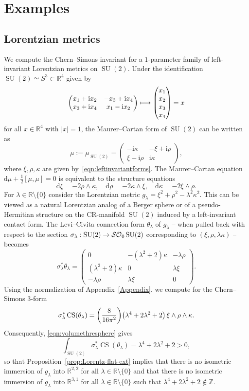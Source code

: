 \documentclass[AHL,Unicode,longabstracts]{cedram}
\DeclareMathOperator{\CS}{CS}
\DeclareMathOperator{\SU}{SU}
\renewcommand*{\d}{\mathrm{d}}
\renewcommand{\i}{\mathrm{i}}
\newcommand*{\R}{\mathbb{R}}
\newcommand{\Z}{\mathbb{Z}}
\newcommand{\clSO}{\mathcal{SO}}
\renewcommand*{\to}{\mathchoice{\longrightarrow}{\rightarrow}{\rightarrow}{\rightarrow}}
\let\oldmapsto\mapsto
\renewcommand*{\mapsto}{\mathchoice{\longmapsto}{\oldmapsto}{\oldmapsto}{\oldmapsto}}
\let\originalleft\left
\let\originalright\right
\renewcommand{\left}{\mathopen{}\mathclose\bgroup\originalleft}
\renewcommand{\right}{\aftergroup\egroup\originalright}
\newcommand*{\R}{\mathbb{R}}
\begin{document}
\section{Examples}\label{app:examples}

\subsection{Lorentzian metrics}

We compute the Chern--Simons invariant for a $1$-parameter family of left-invariant Lorentzian metrics on $\SU(2)$. Under the identification $\SU(2)\simeq S^3\subset \R^4$ given by
\[
\begin{pmatrix}
x_1+\i x_2 & -x_3+\i x_4 \\
x_3+\i x_4 & x_1-\i x_2
\end{pmatrix}
\mapsto
\begin{pmatrix} 
x_1 \\
x_2 \\
x_3 \\
x_4
\end{pmatrix}=x
\]
for all $x \in \R^4$ with $|x|=1$, the Maurer--Cartan form of $\SU(2)$ can be written as
\[
\mu:=\mu_{\SU(2)}=
\begin{pmatrix}
-\i \kappa & -\xi+\i \rho \\
\xi+\i\rho & \i \kappa
\end{pmatrix},
\]
where $\xi,\rho,\kappa$ are given by~\eqref{eqn:leftinvariantforms}. The Maurer--Cartan equation $\d\mu+\frac{1}{2}[\mu,\mu]=0$ is equivalent to the structure equations
\[
\d\xi=-2\rho\wedge\kappa, \quad \d\rho=-2\kappa\wedge\xi, \quad \d\kappa=-2\xi\wedge\rho.
\]
For $\lambda \in \R\setminus\{0\}$ consider the Lorentzian metric $g_{\lambda}=\xi^2+\rho^2-\lambda^2\kappa^2$. This can be viewed as a natural Lorentzian analog of a Berger sphere or of a pseudo-Hermitian structure on the CR-manifold $\SU(2)$ induced by a left-invariant contact form. The Levi--Civita connection form $\theta_{\lambda}$ of $g_{\lambda}$ -- when pulled back with respect to the section $\sigma_{\lambda} : \SU(2) \to \clSO _0\SU(2)$ corresponding to $(\xi,\rho,\lambda\kappa)$ -- becomes
\[
\sigma^*_{\lambda}\theta_{\lambda}=
\begin{pmatrix}
0 & -(\lambda^2+2)\kappa & -\lambda\rho \\
(\lambda^2+2)\kappa & 0 & \lambda\xi \\
-\lambda\rho & \lambda\xi & 0
\end{pmatrix}.
\]
Using the normalization of Appendix~\ref{Appendix}, we compute for the Chern--Simons $3$-form
\[
\sigma^*_{\lambda}\CS(\theta_{\lambda})=\left(\frac{8}{16\pi^2}\right)\left(\lambda^4+2\lambda^2+2\right)\,\xi\wedge\rho\wedge\kappa.
\]
Consequently, \eqref{eqn:volumethresphere} gives
\[
\int_{\SU(2)}\sigma^*_{\lambda}\CS(\theta_{\lambda})=\lambda^4+2\lambda^2+2>0,
\]
so that Proposition~\ref{prop:Lorentz-flat-ext} implies that there is no isometric immersion of $g_{\lambda}$ into $\R^{2,2}$ for all $\lambda \in \R\setminus\{0\}$ and that there is no isometric immersion of $g_{\lambda}$ into $\R^{3,1}$ for all $\lambda \in \R\setminus\{0\}$ such that $\lambda^4+2\lambda^2+2 \notin \Z$.
\end{document}
